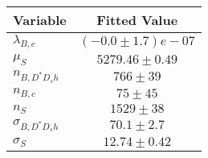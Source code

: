 \begin{tabular}[t]{lc}
\hline
Variable &Fitted Value\\
\hline\hline
$\lambda_{B,c}$&$(-0.0\pm1.7)e-07$\\
\hline
$\mu_S$&$5279.46\pm0.49$\\
\hline
$n_{B, D^* D_s h}$&$766\pm39$\\
\hline
$n_{B,c}$&$75\pm45$\\
\hline
$n_S$&$1529\pm38$\\
\hline
$\sigma_{B, D^* D_s h}$&$70.1\pm2.7$\\
\hline
$\sigma_S$&$12.74\pm0.42$\\
\hline
\end{tabular}